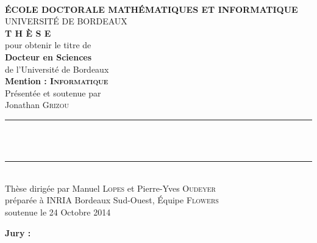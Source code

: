
\begin{titlepage}
\begin{center}
 \\
\vspace*{0.3cm}
\noindent \textbf{\'ECOLE DOCTORALE MATH\'EMATIQUES ET INFORMATIQUE} \\
\noindent UNIVERSIT\'E DE BORDEAUX \\
\vspace*{0.5cm}
\noindent \Huge \textbf{T H È S E} \\
\vspace*{0.3cm}
\noindent \large {pour obtenir le titre de} \\
\vspace*{0.3cm}
\noindent \LARGE \textbf{Docteur en Sciences} \\
\vspace*{0.3cm}
\noindent \Large de l'Université de Bordeaux \\
\noindent \Large \textbf{Mention : \textsc{Informatique}}\\
\vspace*{0.4cm}
\noindent \large {Présentée et soutenue par\\}
\noindent \LARGE Jonathan \textsc{Grizou} \\
\vspace*{0.4cm}
\noindent\rule{10cm}{0.4pt}\\
\vspace*{0.4cm}
 \\
\vspace*{0.4cm}
\noindent\rule{10cm}{0.4pt}\\
\vspace*{0.4cm}
\noindent \Large Thèse dirigée par Manuel \textsc{Lopes} et Pierre-Yves \textsc{Oudeyer} \\
\vspace*{0.2cm}
\noindent \Large préparée à INRIA Bordeaux Sud-Ouest, Équipe \textsc{Flowers}\\
\vspace*{0.2cm}
\noindent \large soutenue le 24 Octobre 2014 \\
\vspace*{0.5cm}
\end{center}
\noindent \large \textbf{Jury :} \\

\end{titlepage}
